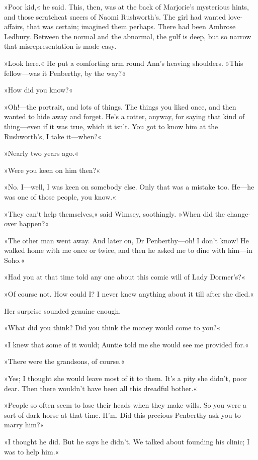 »Poor kid,« he said. This, then, was at the back of Marjorie's mysterious hints, and those scratchcat sneers of Naomi Rushworth's. The girl had wanted love-affairs, that was certain; imagined them perhaps. There had been Ambrose Ledbury. Between the normal and the abnormal, the gulf is deep, but so narrow that misrepresentation is made easy.

»Look here.« He put a comforting arm round Ann's heaving shoulders. »This fellow—was it Penberthy, by the way?«

»How did you know?«

»Oh!—the portrait, and lots of things. The things you liked once, and then wanted to hide away and forget. He's a rotter, anyway, for saying that kind of thing—even if it was true, which it isn't. You got to know him at the Rushworth's, I take it—when?«

»Nearly two years ago.«

»Were you keen on him then?«

»No. I—well, I was keen on somebody else. Only that was a mistake too. He—he was one of those people, you know.«

»They can't help themselves,« said Wimsey, soothingly. »When did the change-over happen?«

»The other man went away. And later on, Dr Penberthy—oh! I don't know! He walked home with me once or twice, and then he asked me to dine with him—in Soho.«

»Had you at that time told any one about this comic will of Lady Dormer's?«

»Of course not. How could I? I never knew anything about it till after she died.«

Her surprise sounded genuine enough.

»What did you think? Did you think the money would come to you?«

»I knew that some of it would; Auntie told me she would see me provided for.«

»There were the grandsons, of course.«

»Yes; I thought she would leave most of it to them. It's a pity she didn't, poor dear. Then there wouldn't have been all this dreadful bother.«

»People so often seem to lose their heads when they make wills. So you were a sort of dark horse at that time. H'm. Did this precious Penberthy ask you to marry him?«

»I thought he did. But he says he didn't. We talked about founding his clinic; I was to help him.«

